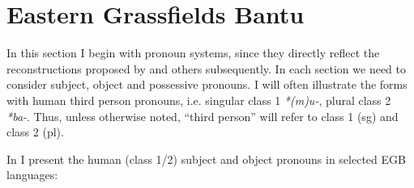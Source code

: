 \documentclass[output=paper]{langsci/langscibook}
\begin{document}
\clearpage 
\section{ Eastern Grassfields Bantu} 
In this section I begin with  pronoun systems, since they directly reflect the reconstructions proposed by   \citet{HymanTadadjeu1976} and others subsequently. In each section we need to consider subject, object and possessive pronouns. I will often illustrate the forms with human third person pronouns, i.e. singular class 1 \textit{*(m)u-}, plural class 2 \textit{*ba-}. Thus, unless otherwise noted, “third person” will refer to class 1 (sg) and class 2 (pl).

  In  I present the human (class 1/2) subject and object pronouns in selected EGB languages:
\end{document}
